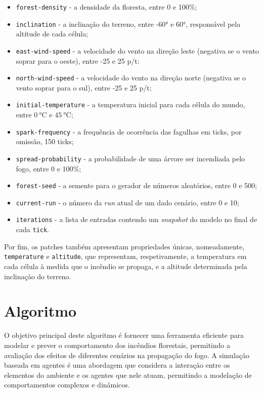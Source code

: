 \begin{itemize}
    \item \texttt{forest-density} - a densidade da floresta, entre 0 e 100\%;
    \item \texttt{inclination} - a inclinação do terreno, entre \ang{-60} e \ang{60}, responsável pela altitude de cada célula;
    \item \texttt{east-wind-speed} - a velocidade do vento na direção leste (negativa se o vento soprar para o oeste), entre -25 e 25 p/t:
    \item \texttt{north-wind-speed} - a velocidade do vento na direção norte (negativa se o vento soprar para o sul), entre -25 e 25 p/t;
    \item \texttt{initial-temperature} - a temperatura inicial para cada célula do mundo, entre $\SI{0}{\degreeCelsius}$ e $\SI{45}{\degreeCelsius}$;
    \item \texttt{spark-frequency} - a frequência de ocorrência das fagulhas em ticks, por omissão, 150 ticks;
    \item \texttt{spread-probability} - a probabilidade de uma árvore ser incendiada pelo fogo, entre 0 e 100\%;
    \item \texttt{forest-seed} - a semente para o gerador de números aleatórios, entre 0 e 500;
    \item \texttt{current-run} - o número da \textit{run} atual de um dado cenário, entre 0 e 10;
    \item \texttt{iterations} - a lista de entradas contendo um \textit{snapshot} do modelo no final de cada \texttt{tick}.
\end{itemize}

Por fim, os patches também apresentam propriedades únicas, nomeadamente, \texttt{temperature} e \texttt{altitude}, que representam, respetivamente, a temperatura em cada célula à medida que o incêndio se propaga, e a altitude determinada pela inclinação do terreno.

\section{Algoritmo}\label{sec:algorithm}

O objetivo principal deste algoritmo é fornecer uma ferramenta eficiente para modelar e prever o comportamento dos incêndios florestais, permitindo a avaliação dos efeitos de diferentes cenários na propagação do fogo. A simulação baseada em agentes é uma abordagem que considera a interação entre os elementos do ambiente e os agentes que nele atuam, permitindo a modelação de comportamentos complexos e dinâmicos. 

